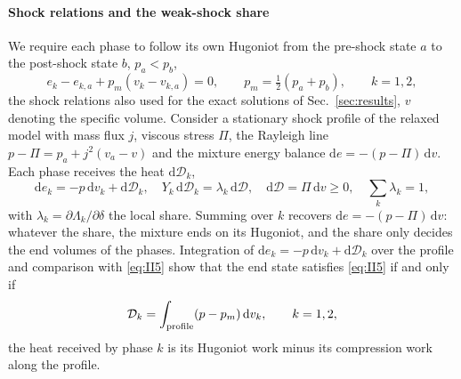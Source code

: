 \documentclass[a4paper,fleqn]{cas-sc}
\begin{document}
\paragraph{Shock relations and the weak-shock share}
We require each phase to follow its own Hugoniot \cite{SaurelGavrilyukRenaud2003,SPB2009} from the pre-shock state $a$ to the
post-shock state $b$, $p_a<p_b$,
\begin{equation}
e_k-e_{k,a}+p_m(v_k-v_{k,a})=0,\qquad p_m=\tfrac12(p_a+p_b),\qquad k=1,2,
\label{eq:II5}
\end{equation}
the shock relations also used for the exact solutions of Sec.~\ref{sec:results}, $v$ denoting the specific volume. Consider a stationary shock profile of the
relaxed model with mass flux $j$, viscous stress $\Pi$, the Rayleigh line
$p-\Pi=p_a+j^2(v_a-v)$ and the mixture energy balance $\mathrm de=-(p-\Pi)\,\mathrm dv$. Each phase receives the heat $\mathrm d\mathcal D_k$,
\begin{equation}
\mathrm de_k=-p\,\mathrm dv_k+\mathrm d\mathcal D_k,\quad Y_k\,\mathrm d\mathcal D_k=\lambda_k\,\mathrm d\mathcal D,\quad \mathrm d\mathcal D=\Pi\,\mathrm dv\ge0,\quad \textstyle\sum_k\lambda_k=1,
\label{eq:profile}
\end{equation}
with $\lambda_k=\partial\Lambda_k/\partial\delta$ the local share. Summing over $k$ recovers $\mathrm de=-(p-\Pi)\,\mathrm dv$: whatever the share, the
mixture ends on its Hugoniot, and the share only decides the end volumes of the phases. Integration of
$\mathrm de_k=-p\,\mathrm dv_k+\mathrm d\mathcal D_k$ over the profile and comparison with \eqref{eq:II5} show that the end state satisfies \eqref{eq:II5} if and only if
\begin{equation}
\mathcal D_k=\int_{\rm profile}(p-p_m)\,\mathrm dv_k ,\qquad k=1,2,
\label{eq:heat}
\end{equation}
the heat received by phase $k$ is its Hugoniot work minus its compression work along the profile.
\end{document}
